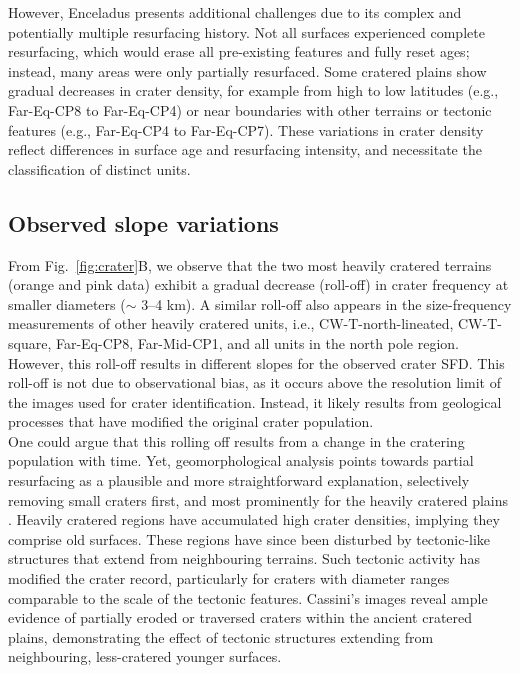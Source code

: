\documentclass[preprint,11pt,3p,times,authoryear]{elsarticle}
\begin{document}
However, Enceladus presents additional challenges due to its complex and potentially multiple resurfacing history. Not all surfaces experienced complete resurfacing, which would erase all pre-existing features and fully reset ages; instead, many areas were only partially resurfaced. Some cratered plains show gradual decreases in crater density, for example from high to low latitudes (e.g., Far-Eq-CP8 to Far-Eq-CP4) or near boundaries with other terrains or tectonic features (e.g., Far-Eq-CP4 to Far-Eq-CP7). These variations in crater density reflect differences in surface age and resurfacing intensity, and necessitate the classification of distinct units.\\


\subsection{Observed slope variations}
\label{subsec:rolloff}
From Fig.~\ref{fig:crater}B, we observe that the two most heavily cratered terrains (orange and pink data) exhibit a gradual decrease (roll-off) in crater frequency at smaller diameters ($\sim$ 3--4 km). A similar roll-off also appears in the size-frequency measurements of other heavily cratered units, i.e., CW-T-north-lineated, CW-T-square, Far-Eq-CP8, Far-Mid-CP1, and all units in the north pole region. However, this roll-off results in different slopes for the observed crater SFD. This roll-off is not due to observational bias, as it occurs above the resolution limit of the images used for crater identification. Instead, it likely results from geological processes that have modified the original crater population.\\

One could argue that this rolling off results from a change in the cratering population with time. Yet, geomorphological analysis points towards partial resurfacing as a plausible and more straightforward explanation, selectively removing small craters first, and most prominently for the heavily cratered plains \citep{Michael2010}. Heavily cratered regions have accumulated high crater densities, implying they comprise old surfaces. These regions have since been disturbed by tectonic-like structures that extend from neighbouring terrains. Such tectonic activity has modified the crater record, particularly for craters with diameter ranges comparable to the scale of the tectonic features. Cassini’s images reveal ample evidence of partially eroded or traversed craters within the ancient cratered plains, demonstrating the effect of tectonic structures extending from neighbouring, less-cratered younger surfaces.\\
\end{document}
